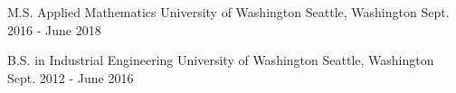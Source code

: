 

\begin{cventries}

  \cventry
    {M.S. Applied Mathematics} %
    {University of Washington} %
    {Seattle, Washington} %
    {Sept. 2016 - June 2018} %
	{}

  \cventry
    {B.S. in Industrial Engineering} %
    {University of Washington} %
    {Seattle, Washington} %
    {Sept. 2012 - June 2016} %
	{}


\end{cventries}
